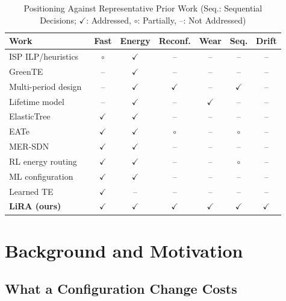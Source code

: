 \documentclass[journal]{IEEEtran}
\begin{document}
\begin{table}[t]
\centering
\caption{Positioning Against Representative Prior Work (Seq.: Sequential Decisions; $\checkmark$: Addressed, $\circ$: Partially, --: Not Addressed)}
\label{tab:related}
\footnotesize
\setlength{\tabcolsep}{3pt}
\begin{tabular}{@{}lcccccc@{}}
\toprule
Work & Fast & Energy & Reconf. & Wear & Seq. & Drift \\
\midrule
ISP ILP/heuristics~\cite{chiaraviglio2012minimizing} & $\circ$ & $\checkmark$ & -- & -- & -- & -- \\
GreenTE~\cite{zhang2010greente} & -- & $\checkmark$ & -- & -- & -- & -- \\
Multi-period design~\cite{bonetto2013multiperiod} & -- & $\checkmark$ & $\checkmark$ & -- & $\checkmark$ & -- \\
Lifetime model~\cite{chiaraviglio2015lifetime} & -- & $\checkmark$ & -- & $\checkmark$ & -- & -- \\
ElasticTree~\cite{heller2010elastictree} & $\checkmark$ & $\checkmark$ & -- & -- & -- & -- \\
EATe~\cite{vasic2010eate} & $\checkmark$ & $\checkmark$ & $\circ$ & -- & $\circ$ & -- \\
MER-SDN~\cite{assefa2018mersdn} & $\checkmark$ & $\checkmark$ & -- & -- & -- & -- \\
RL energy routing~\cite{frohlich2021rl,zheng2022energysaving} & $\checkmark$ & $\checkmark$ & -- & -- & $\circ$ & -- \\
ML configuration~\cite{gomezdelahiz2025noms,gomezdelahiz2026tgcn} & $\checkmark$ & $\checkmark$ & -- & -- & -- & -- \\
Learned TE~\cite{xu2023teal,perry2023dote,almasan2022enero} & $\checkmark$ & -- & -- & -- & -- & -- \\
\midrule
\textbf{LiRA (ours)} & $\checkmark$ & $\checkmark$ & $\checkmark$ & $\checkmark$ & $\checkmark$ & $\checkmark$ \\
\bottomrule
\end{tabular}
\end{table}

\section{Background and Motivation}\label{sec:motivation}

\subsection{What a Configuration Change Costs}
\end{document}
